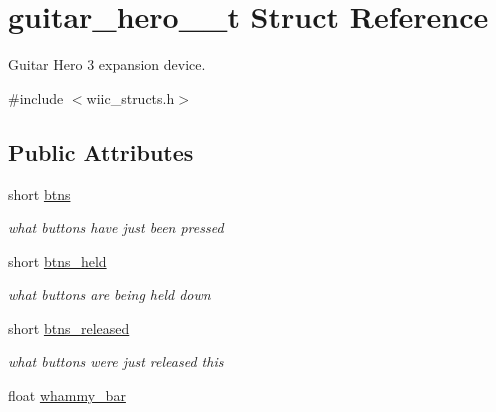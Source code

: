 \hypertarget{structguitar__hero__3__t}{\section{guitar\-\_\-hero\-\_\-\_\-t Struct Reference}
\label{structguitar__hero__3__t}
}


Guitar Hero 3 expansion device.  




{\ttfamily \#include $<$wiic\-\_\-structs.\-h$>$}

\subsection*{Public Attributes}
\begin{DoxyCompactItemize}
\item 
\hypertarget{structguitar__hero__3__t_a65e19f650d5ce8298707eb63707abd7f}{short \hyperlink{structguitar__hero__3__t_a65e19f650d5ce8298707eb63707abd7f}{btns}}\label{structguitar__hero__3__t_a65e19f650d5ce8298707eb63707abd7f}

\begin{DoxyCompactList}\small\item\em what buttons have just been pressed \end{DoxyCompactList}\item 
\hypertarget{structguitar__hero__3__t_ab738e83c9952dec3145e60a4b97727ce}{short \hyperlink{structguitar__hero__3__t_ab738e83c9952dec3145e60a4b97727ce}{btns\-\_\-held}}\label{structguitar__hero__3__t_ab738e83c9952dec3145e60a4b97727ce}

\begin{DoxyCompactList}\small\item\em what buttons are being held down \end{DoxyCompactList}\item 
\hypertarget{structguitar__hero__3__t_aefddbb47a726fff6b5e124f3f0008716}{short \hyperlink{structguitar__hero__3__t_aefddbb47a726fff6b5e124f3f0008716}{btns\-\_\-released}}\label{structguitar__hero__3__t_aefddbb47a726fff6b5e124f3f0008716}

\begin{DoxyCompactList}\small\item\em what buttons were just released this \end{DoxyCompactList}\item 
\hypertarget{structguitar__hero__3__t_a600aeec0929ee91d57d4685d79876942}{float \hyperlink{structguitar__hero__3__t_a600aeec0929ee91d57d4685d79876942}{whammy\-\_\-bar}}\label{structguitar__hero__3__t_a600aeec0929ee91d57d4685d79876942}


\end{DoxyCompactItemize}
